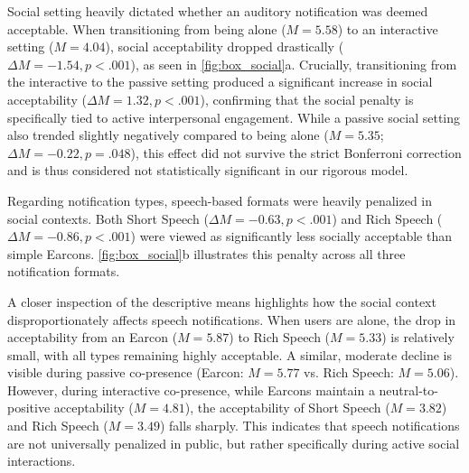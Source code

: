Social setting heavily dictated whether an auditory notification was deemed acceptable. When transitioning from being alone ($M = 5.58$) to an interactive setting ($M = 4.04$), social acceptability dropped drastically ($\Delta M = -1.54, p < .001$), as seen in \autoref{fig:box_social}a. Crucially, transitioning from the interactive to the passive setting produced a significant increase in social acceptability ($\Delta M = 1.32, p < .001$), confirming that the social penalty is specifically tied to active interpersonal engagement. While a passive social setting also trended slightly negatively compared to being alone ($M = 5.35$; $\Delta M = -0.22, p = .048$), this effect did not survive the strict Bonferroni correction and is thus considered not statistically significant in our rigorous model.

Regarding notification types, speech-based formats were heavily penalized in social contexts. Both Short Speech ($\Delta M = -0.63, p < .001$) and Rich Speech ($\Delta M = -0.86, p < .001$) were viewed as significantly less socially acceptable than simple Earcons. \autoref{fig:box_social}b illustrates this penalty across all three notification formats.

A closer inspection of the descriptive means highlights how the social context disproportionately affects speech notifications. When users are alone, the drop in acceptability from an Earcon ($M = 5.87$) to Rich Speech ($M = 5.33$) is relatively small, with all types remaining highly acceptable. A similar, moderate decline is visible during passive co-presence (Earcon: $M = 5.77$ vs. Rich Speech: $M = 5.06$). However, during interactive co-presence, while Earcons maintain a neutral-to-positive acceptability ($M = 4.81$), the acceptability of Short Speech ($M = 3.82$) and Rich Speech ($M = 3.49$) falls sharply. This indicates that speech notifications are not universally penalized in public, but rather specifically during active social interactions.

